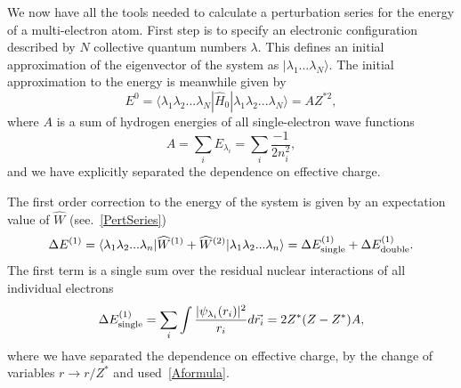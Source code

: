 We now have all the tools needed to calculate a perturbation series for the energy of a multi-electron atom. First step is to specify an electronic configuration described by $N$ collective quantum numbers $\lambda$. This defines an initial approximation of the eigenvector of the system as $|\lambda_{1}\ldots\lambda_{N}\rangle$. The initial approximation to the energy is meanwhile given by
\begin{equation}
E^0 = \langle \lambda_1 \lambda_2 ... \lambda_N | \widehat{H}_0 | \lambda_1
\lambda_2... \lambda_N \rangle = A Z^{*2},\label{eq:9}
\end{equation}
where $A$ is a sum of hydrogen energies of all single-electron
wave functions
\begin{equation}
A=\sum_i E_{\lambda_i} = \sum_i \frac{-1}{2n_i^2},\label{eq:8}
\end{equation}
and we have explicitly separated the dependence on effective charge.

The first order correction to the energy of the
system is given by an expectation value of $\widehat{W}$ (see.~\eqref{PertSeries})
\begin{equation} \label{FirstEnergy}
\Delta E^{(1)} = \langle \lambda_1 \lambda_2 ... \lambda_n |
\widehat{W}^{(1)}+\widehat{W}^{(2)} | \lambda_1 \lambda_2... \lambda_n \rangle =
\Delta E^{(1)}_{\rm{single}} + \Delta E^{(1)}_{\rm{double}}.
\end{equation}
The first term is a single sum over the residual nuclear interactions of all individual electrons
\begin{equation} \label{SchrA}
    \Delta E^{(1)}_{\rm{single}} = \sum_i \int \frac{|\psi_{\lambda_i}(r_i)|^2}{r_i} d\vec{r_i} = 2 Z^*(Z-Z^*)A,
\end{equation}
where we have separated the dependence on effective charge, by the change of variables $r \rightarrow r/Z^*$ and used~\eqref{Aformula}.

